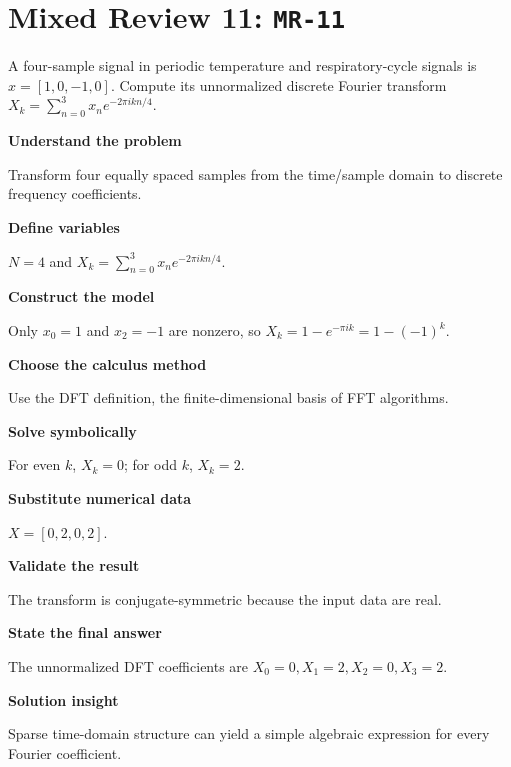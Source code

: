 \documentclass[11pt]{book}
\newcommand{\pid}[1]{\texttt{#1}}
\begin{document}
\section*{Mixed Review 11: \pid{MR-11}}
\begin{problembox}A four-sample signal in periodic temperature and respiratory-cycle signals is $x=[1,0,-1,0]$. Compute its unnormalized discrete Fourier transform $X_k=\sum_{n=0}^3 x_ne^{-2\pi i kn/4}$.\end{problembox}
\begin{solutionbox}
\textbf{Understand the problem}\par Transform four equally spaced samples from the time/sample domain to discrete frequency coefficients.\par\medskip
\textbf{Define variables}\par $N=4$ and $X_k=\sum_{n=0}^{3}x_n e^{-2\pi i kn/4}$.\par\medskip
\textbf{Construct the model}\par Only $x_0=1$ and $x_2=-1$ are nonzero, so $X_k=1-e^{-\pi i k}=1-(-1)^k$.\par\medskip
\textbf{Choose the calculus method}\par Use the DFT definition, the finite-dimensional basis of FFT algorithms.\par\medskip
\textbf{Solve symbolically}\par For even $k$, $X_k=0$; for odd $k$, $X_k=2$.\par\medskip
\textbf{Substitute numerical data}\par $X=[0,2,0,2]$.\par\medskip
\textbf{Validate the result}\par The transform is conjugate-symmetric because the input data are real.\par\medskip
\textbf{State the final answer}\par The unnormalized DFT coefficients are $X_0=0,X_1=2,X_2=0,X_3=2$.\par\medskip
\textbf{Solution insight}\par Sparse time-domain structure can yield a simple algebraic expression for every Fourier coefficient.\par\medskip
\end{solutionbox}
\end{document}

